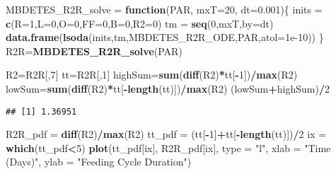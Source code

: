 \documentclass[]{article}
\newenvironment{Shaded}{\begin{snugshade}}{\end{snugshade}}
\newcommand{\ControlFlowTok}[1]{\textcolor[rgb]{0.13,0.29,0.53}{\textbf{#1}}}
\newcommand{\DataTypeTok}[1]{\textcolor[rgb]{0.13,0.29,0.53}{#1}}
\newcommand{\DecValTok}[1]{\textcolor[rgb]{0.00,0.00,0.81}{#1}}
\newcommand{\FloatTok}[1]{\textcolor[rgb]{0.00,0.00,0.81}{#1}}
\newcommand{\KeywordTok}[1]{\textcolor[rgb]{0.13,0.29,0.53}{\textbf{#1}}}
\newcommand{\NormalTok}[1]{#1}
\newcommand{\OperatorTok}[1]{\textcolor[rgb]{0.81,0.36,0.00}{\textbf{#1}}}
\newcommand{\StringTok}[1]{\textcolor[rgb]{0.31,0.60,0.02}{#1}}
\begin{document}
\begin{Shaded}
\begin{Highlighting}[]
\NormalTok{MBDETES_R2R_solve =}\StringTok{ }\ControlFlowTok{function}\NormalTok{(PAR, }\DataTypeTok{mxT=}\DecValTok{20}\NormalTok{, }\DataTypeTok{dt=}\FloatTok{0.001}\NormalTok{)\{}
\NormalTok{  inits =}\StringTok{ }\KeywordTok{c}\NormalTok{(}\DataTypeTok{R=}\DecValTok{1}\NormalTok{,}\DataTypeTok{L=}\DecValTok{0}\NormalTok{,}\DataTypeTok{O=}\DecValTok{0}\NormalTok{,}\DataTypeTok{FF=}\DecValTok{0}\NormalTok{,}\DataTypeTok{B=}\DecValTok{0}\NormalTok{,}\DataTypeTok{R2=}\DecValTok{0}\NormalTok{)}
\NormalTok{  tm =}\StringTok{ }\KeywordTok{seq}\NormalTok{(}\DecValTok{0}\NormalTok{,mxT,}\DataTypeTok{by=}\NormalTok{dt)}
  \KeywordTok{data.frame}\NormalTok{(}\KeywordTok{lsoda}\NormalTok{(inits,tm,MBDETES_R2R_ODE,PAR,}\DataTypeTok{atol=}\FloatTok{1e-10}\NormalTok{))}
\NormalTok{\}}
\NormalTok{R2R=}\KeywordTok{MBDETES_R2R_solve}\NormalTok{(PAR)}
\end{Highlighting}
\end{Shaded}

\begin{Shaded}
\begin{Highlighting}[]
\NormalTok{R2=R2R[,}\DecValTok{7}\NormalTok{]}
\NormalTok{tt=R2R[,}\DecValTok{1}\NormalTok{]}
\NormalTok{highSum=}\KeywordTok{sum}\NormalTok{(}\KeywordTok{diff}\NormalTok{(R2)}\OperatorTok{*}\NormalTok{tt[}\OperatorTok{-}\DecValTok{1}\NormalTok{])}\OperatorTok{/}\KeywordTok{max}\NormalTok{(R2)}
\NormalTok{lowSum=}\KeywordTok{sum}\NormalTok{(}\KeywordTok{diff}\NormalTok{(R2)}\OperatorTok{*}\NormalTok{tt[}\OperatorTok{-}\KeywordTok{length}\NormalTok{(tt)])}\OperatorTok{/}\KeywordTok{max}\NormalTok{(R2)}
\NormalTok{(lowSum}\OperatorTok{+}\NormalTok{highSum)}\OperatorTok{/}\DecValTok{2}
\end{Highlighting}
\end{Shaded}

\begin{verbatim}
## [1] 1.36951
\end{verbatim}

\begin{Shaded}
\begin{Highlighting}[]
\NormalTok{R2R_pdf =}\StringTok{ }\KeywordTok{diff}\NormalTok{(R2)}\OperatorTok{/}\KeywordTok{max}\NormalTok{(R2)}
\NormalTok{tt_pdf =}\StringTok{ }\NormalTok{(tt[}\OperatorTok{-}\DecValTok{1}\NormalTok{]}\OperatorTok{+}\NormalTok{tt[}\OperatorTok{-}\KeywordTok{length}\NormalTok{(tt)])}\OperatorTok{/}\DecValTok{2}
\NormalTok{ix =}\StringTok{ }\KeywordTok{which}\NormalTok{(tt_pdf}\OperatorTok{<}\DecValTok{5}\NormalTok{)}
\KeywordTok{plot}\NormalTok{(tt_pdf[ix], R2R_pdf[ix], }\DataTypeTok{type =} \StringTok{"l"}\NormalTok{, }\DataTypeTok{xlab =} \StringTok{"Time (Days)"}\NormalTok{, }\DataTypeTok{ylab =} \StringTok{"Feeding Cycle Duration"}\NormalTok{)}
\end{Highlighting}
\end{Shaded}
\end{document}
